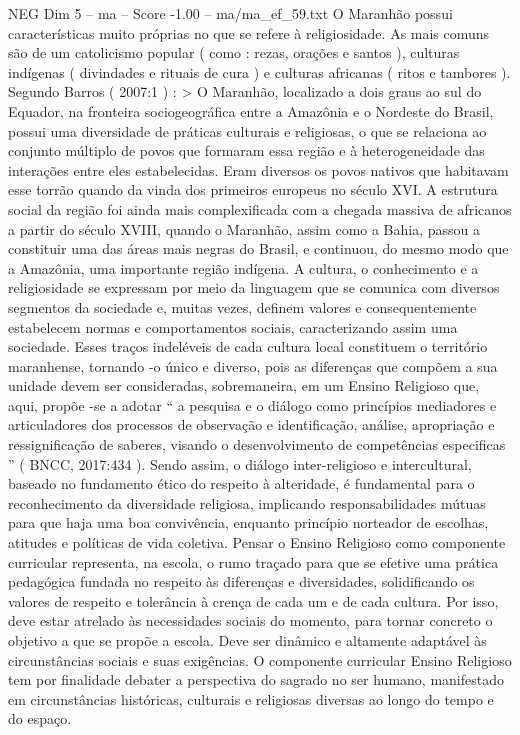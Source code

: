 \begin{textsample}{NEG Dim 5 – ma – Score -1.00 – ma/ma\_ef\_59.txt}
O Maranhão possui características muito próprias no que se refere à religiosidade.
As mais comuns são de um catolicismo popular ( como : rezas, orações e santos ), culturas indígenas ( divindades e rituais de cura ) e culturas africanas ( ritos e tambores ).
Segundo Barros ( 2007:1 ) : > O Maranhão, localizado a dois graus ao sul do Equador, na fronteira sociogeográfica entre a Amazônia e o Nordeste do Brasil, possui uma diversidade de práticas culturais e religiosas, o que se relaciona ao conjunto múltiplo de povos que formaram essa região e à heterogeneidade das interações entre eles estabelecidas.
Eram diversos os povos nativos que habitavam esse torrão quando da vinda dos primeiros europeus no século XVI.
A estrutura social da região foi ainda mais complexificada com a chegada massiva de africanos a partir do século XVIII, quando o Maranhão, assim como a Bahia, passou a constituir uma das áreas mais negras do Brasil, e continuou, do mesmo modo que a Amazônia, uma importante região indígena.
A cultura, o conhecimento e a religiosidade se expressam por meio da linguagem que se comunica com diversos segmentos da sociedade e, muitas vezes, definem valores e consequentemente estabelecem normas e comportamentos sociais, caracterizando assim uma sociedade.
Esses traços indeléveis de cada cultura local constituem o território maranhense, tornando -o único e diverso, pois as diferenças que compõem a sua unidade devem ser consideradas, sobremaneira, em um Ensino Religioso que, aqui, propõe -se a adotar “ a pesquisa e o diálogo como princípios mediadores e articuladores dos processos de observação e identificação, análise, apropriação e ressignificação de saberes, visando o desenvolvimento de competências especificas ” ( BNCC, 2017:434 ).
Sendo assim, o diálogo inter-religioso e intercultural, baseado no fundamento ético do respeito à alteridade, é fundamental para o reconhecimento da diversidade religiosa, implicando responsabilidades mútuas para que haja uma boa convivência, enquanto princípio norteador de escolhas, atitudes e políticas de vida coletiva.
Pensar o Ensino Religioso como componente curricular representa, na escola, o rumo traçado para que se efetive uma prática pedagógica fundada no respeito às diferenças e diversidades, solidificando os valores de respeito e tolerância à crença de cada um e de cada cultura.
Por isso, deve estar atrelado às necessidades sociais do momento, para tornar concreto o objetivo a que se propõe a escola.
Deve ser dinâmico e altamente adaptável às circunstâncias sociais e suas exigências.
O componente curricular Ensino Religioso tem por finalidade debater a perspectiva do sagrado no ser humano, manifestado em circunstâncias históricas, culturais e religiosas diversas ao longo do tempo e do espaço.

\end{textsample}
